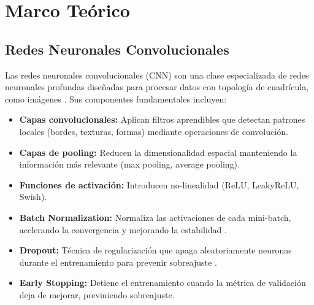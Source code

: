 \documentclass[12pt,a4paper]{article}
\begin{document}
\section{Marco Teórico}
\label{sec:marco_teorico}

\subsection{Redes Neuronales Convolucionales}

Las redes neuronales convolucionales (CNN) son una clase especializada de redes neuronales profundas 
diseñadas para procesar datos con topología de cuadrícula, como imágenes \cite{lecun2015deep}. 
Sus componentes fundamentales incluyen:

\begin{itemize}
    \item \textbf{Capas convolucionales:} Aplican filtros aprendibles que detectan patrones locales 
          (bordes, texturas, formas) mediante operaciones de convolución.
    \item \textbf{Capas de pooling:} Reducen la dimensionalidad espacial manteniendo la información 
          más relevante (max pooling, average pooling).
    \item \textbf{Funciones de activación:} Introducen no-linealidad (ReLU, LeakyReLU, Swish).
    \item \textbf{Batch Normalization:} Normaliza las activaciones de cada mini-batch, 
          acelerando la convergencia y mejorando la estabilidad \cite{ioffe2015batch}.
    \item \textbf{Dropout:} Técnica de regularización que apaga aleatoriamente neuronas durante 
          el entrenamiento para prevenir sobreajuste \cite{srivastava2014dropout}.
    \item \textbf{Early Stopping:} Detiene el entrenamiento cuando la métrica de validación 
          deja de mejorar, previniendo sobreajuste.
\end{itemize}

\end{document}
